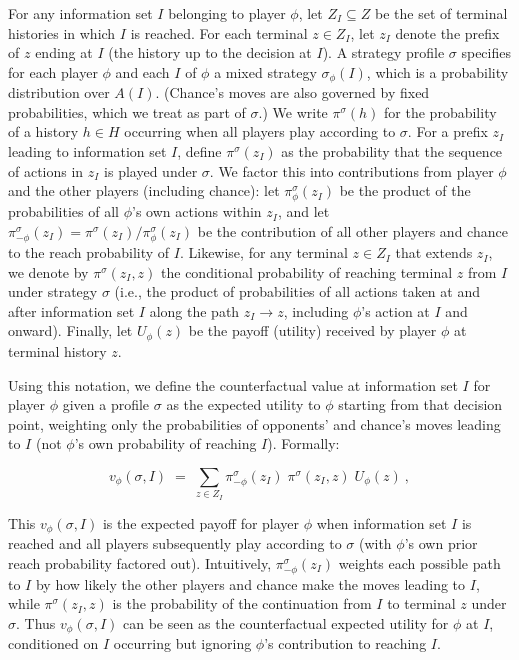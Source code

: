 \documentclass{article}
\begin{document}
For any information set $I$ belonging to player $\phi$, let $Z_I \subseteq Z$ be the set of terminal histories in which $I$ is reached.  For each terminal $z \in Z_I$, let $z_I$ denote the prefix of $z$ ending at $I$ (the history up to the decision at $I$). A strategy profile $\sigma$ specifies for each player $\phi$ and each $I$ of $\phi$ a mixed strategy $\sigma_\phi(I)$, which is a probability distribution over $A(I)$.  (Chance’s moves are also governed by fixed probabilities, which we treat as part of $\sigma$.) We write $\pi^\sigma(h)$ for the probability of a history $h \in H$ occurring when all players play according to $\sigma$.  For a prefix $z_I$ leading to information set $I$, define $\pi^\sigma(z_I)$ as the probability that the sequence of actions in $z_I$ is played under $\sigma$. We factor this into contributions from player $\phi$ and the other players (including chance): let $\pi^\sigma_{\phi}(z_I)$ be the product of the probabilities of all $\phi$’s own actions within $z_I$, and let $\pi^\sigma_{-\phi}(z_I) = \pi^\sigma(z_I) / \pi^\sigma_{\phi}(z_I)$ be the contribution of all other players and chance to the reach probability of $I$. Likewise, for any terminal $z \in Z_I$ that extends $z_I$, we denote by $\pi^\sigma(z_I, z)$ the conditional probability of reaching terminal $z$ from $I$ under strategy $\sigma$ (i.e., the product of probabilities of all actions taken at and after information set $I$ along the path $z_I \to z$, including $\phi$’s action at $I$ and onward). Finally, let $U_\phi(z)$ be the payoff (utility) received by player $\phi$ at terminal history $z$.

Using this notation, we define the counterfactual value at information set $I$ for player $\phi$ given a profile $\sigma$ as the expected utility to $\phi$ starting from that decision point, weighting only the probabilities of opponents’ and chance’s moves leading to $I$ (not $\phi$’s own probability of reaching $I$). Formally: 

\begin{equation}\label{eq:counterfactual-value}
v_{\phi}(\sigma, I) \;=\; \sum_{z \in Z_I} \pi^\sigma_{-\phi}(z_I)\;\pi^\sigma(z_I, z)\;U_{\phi}(z)~,
\end{equation}

This $v_{\phi}(\sigma,I)$ is the expected payoff for player $\phi$ when information set $I$ is reached and all players subsequently play according to $\sigma$ (with $\phi$’s own prior reach probability factored out). Intuitively, $\pi^\sigma_{-\phi}(z_I)$ weights each possible path to $I$ by how likely the other players and chance make the moves leading to $I$, while $\pi^\sigma(z_I,z)$ is the probability of the continuation from $I$ to terminal $z$ under $\sigma$. Thus $v_{\phi}(\sigma,I)$ can be seen as the counterfactual expected utility for $\phi$ at $I$, conditioned on $I$ occurring but ignoring $\phi$’s contribution to reaching $I$.
\end{document}
